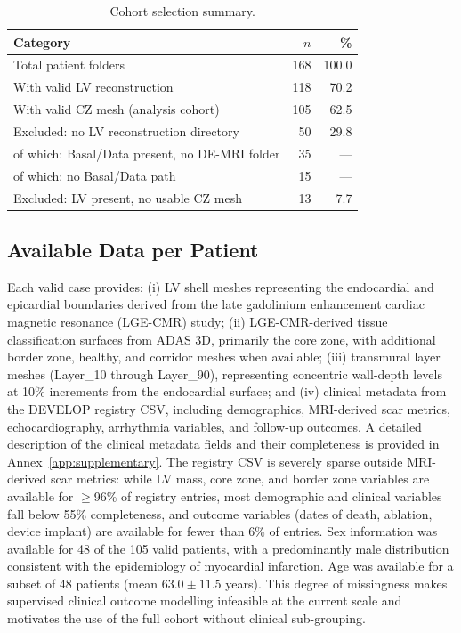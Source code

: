 \begin{table}[htbp]
    \centering
    \caption{Cohort selection summary.}
    \label{tab:cohort}
    \begin{tabular}{lrr}
        \toprule
        Category & $n$ & \% \\
        \midrule
        Total patient folders & 168 & 100.0 \\
        With valid LV reconstruction & 118 & 70.2 \\
        With valid CZ mesh (analysis cohort) & 105 & 62.5 \\
        \midrule
        Excluded: no LV reconstruction directory & 50 & 29.8 \\
        \quad of which: Basal/Data present, no DE-MRI folder & 35 & --- \\
        \quad of which: no Basal/Data path & 15 & --- \\
        Excluded: LV present, no usable CZ mesh & 13 & 7.7 \\
        \bottomrule
    \end{tabular}
\end{table}

\subsection{Available Data per Patient}

Each valid case provides: (i) LV shell meshes representing the endocardial and epicardial
boundaries derived from the late gadolinium enhancement cardiac magnetic resonance
(LGE-CMR) study; (ii) LGE-CMR-derived tissue classification surfaces from ADAS 3D,
primarily the core zone, with
additional border zone, healthy, and corridor meshes when available; (iii) transmural layer
meshes (Layer\_10 through Layer\_90), representing concentric wall-depth levels at 10\%
increments from the endocardial surface; and (iv) clinical metadata from the DEVELOP
registry CSV, including demographics, MRI-derived scar metrics, echocardiography,
arrhythmia variables, and follow-up outcomes. A detailed description of the clinical metadata fields and their completeness is provided in
Annex~\ref{app:supplementary}. The registry CSV is severely sparse outside MRI-derived
scar metrics: while LV mass, core zone, and border zone variables are available for
$\geq$96\% of registry entries, most demographic and clinical variables fall below 55\%
completeness, and outcome variables (dates of death, ablation, device implant) are available
for fewer than 6\% of entries. Sex information was available for 48 of the 105 valid patients,
with a predominantly male distribution consistent with the epidemiology of myocardial
infarction. Age was available for a subset of 48 patients (mean $63.0 \pm 11.5$ years). This
degree of missingness makes supervised clinical outcome modelling infeasible at the current
scale and motivates the use of the full cohort without clinical sub-grouping.

